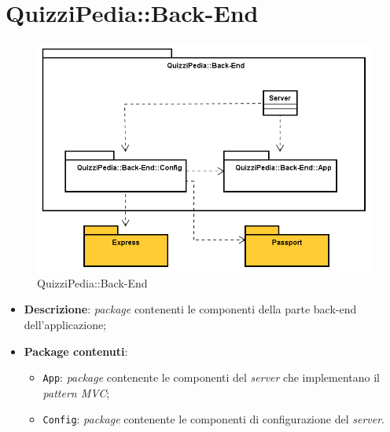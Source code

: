 \newpage
\section{QuizziPedia::Back-End}
\label{QuizziPedia::Back-End}
\begin{figure}[ht]
	\centering
	\includegraphics[scale=0.7]{UML/Package/QuizziPedia_Back-End.png}
	\caption{QuizziPedia::Back-End}
\end{figure}
\FloatBarrier
\begin{itemize}
	\item \textbf{Descrizione}:
	\textit{package} contenenti le componenti della parte back-end dell'applicazione;
	\item \textbf{Package contenuti}:
	\begin{itemize}
		\item \texttt{App}:
		\textit{package} contenente le componenti del \textit{server} che implementano il \textit{pattern MVC};
		\item \texttt{Config}:
		\textit{package} contenente le componenti di configurazione del \textit{server}.
	\end{itemize}
\end{itemize}


	

